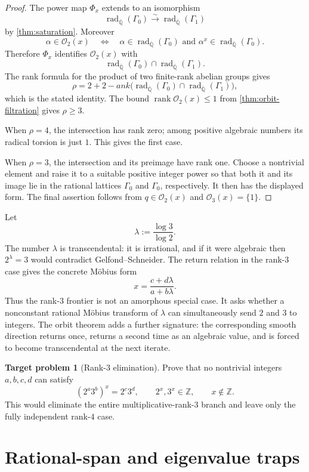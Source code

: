 \documentclass[11pt]{article}
\theoremstyle{definition}
\newtheorem{problem}[theorem]{Target problem}
\newcommand{\Z}{\mathbb{Z}}
\newcommand{\Qbar}{\overline{\mathbb{Q}}}
\newcommand{\rank}{\operatorname{rank}}
\newcommand{\rad}{\operatorname{rad}}
\newcommand{\Gammao}{\Gamma_0}
\newcommand{\Gammai}{\Gamma_1}
\newcommand{\Orb}{\mathcal{O}}
\begin{document}
\begin{proof}
The power map $\Phi_x$ extends to an isomorphism
\[
  \rad_{\Qbar}(\Gammao)\xrightarrow{\sim}
  \rad_{\Qbar}(\Gammai)
\]
by \cref{thm:saturation}.  Moreover
\[
 \alpha\in\Orb_2(x)
 \quad\Longleftrightarrow\quad
 \alpha\in\rad_{\Qbar}(\Gammao)
 \text{ and }
 \alpha^x\in\rad_{\Qbar}(\Gammao).
\]
Therefore $\Phi_x$ identifies $\Orb_2(x)$ with
\[
 \rad_{\Qbar}(\Gammao)\cap\rad_{\Qbar}(\Gammai).
\]
The rank formula for the product of two finite-rank abelian groups gives
\[
 \rho=2+2-
ank\bigl(
 \rad_{\Qbar}(\Gammao)\cap\rad_{\Qbar}(\Gammai)\bigr),
\]
which is the stated identity.  The bound
$\rank\Orb_2(x)\leq1$ from \cref{thm:orbit-filtration} gives $\rho\geq3$.

When $\rho=4$, the intersection has rank zero; among positive algebraic
numbers its radical torsion is just $1$.  This gives the first case.

When $\rho=3$, the intersection and its preimage have rank one.  Choose a
nontrivial element and raise it to a suitable positive integer power so that
both it and its image lie in the rational lattices $\Gammao$ and $\Gammao$,
respectively.  It then has the displayed form.  The final assertion follows
from $q\in\Orb_2(x)$ and $\Orb_3(x)=\{1\}$.
\end{proof}

Let
\[
        \lambda:=\frac{\log3}{\log2}.
\]
The number $\lambda$ is transcendental: it is irrational, and if it were
algebraic then $2^\lambda=3$ would contradict Gelfond--Schneider.  The return
relation in the rank-$3$ case gives the concrete M\"obius form
\[
       x=\frac{c+d\lambda}{a+b\lambda}.
\]
Thus the rank-$3$ frontier is not an amorphous special case.  It asks whether
a nonconstant rational M\"obius transform of $\lambda$ can simultaneously
send $2$ and $3$ to integers.  The orbit theorem adds a further signature:
the corresponding smooth direction returns once, returns a second time as an
algebraic value, and is forced to become transcendental at the next iterate.

\begin{problem}[Rank-$3$ elimination]
Prove that no nontrivial integers $a,b,c,d$ can satisfy
\[
 (2^a3^b)^x=2^c3^d,
 \qquad 2^x,3^x\in\Z,
 \qquad x\notin\Z.
\]
This would eliminate the entire multiplicative-rank-$3$ branch and leave only
the fully independent rank-$4$ case.
\end{problem}

\section{Rational-span and eigenvalue traps}
\end{document}
